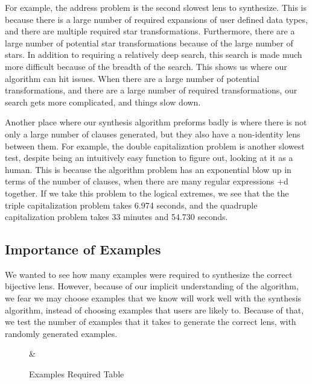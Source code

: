 For example, the address problem is the second slowest lens to synthesize.
This is because there is a large number of required expansions of user defined
data types, and there are multiple required star transformations.
Furthermore, there are a large number of potential star transformations because
of the large number of stars.
In addition to requiring a relatively deep search, this search is made much
more difficult because of the breadth of the search.
This shows us where our algorithm can hit issues.
When there are a large number of potential transformations, and there are a
large number of required transformations, our search gets more complicated,
and things slow down.

Another place where our synthesis algorithm preforms badly is where there is not
only a large number of clauses generated, but they also have a non-identity
lens between them.
For example, the double capitalization problem is another slowest test, despite
being an intuitively easy function to figure out, looking at it as a human.
This is because the algorithm problem has an exponential blow up in terms
of the number of clauses, when there are many regular expressions +d together.
If we take this problem to the logical extremes, we see that the the triple
capitalization problem takes 6.974 seconds, and the quadruple capitalization
problem takes 33 minutes and 54.730 seconds.

\subsection{Importance of Examples}
We wanted to see how many examples were required to synthesize the correct
bijective lens.
However, because of our implicit understanding of the algorithm, we fear we may
choose examples that we know will work well with the synthesis algorithm,
instead of choosing examples that users are likely to.
Because of that, we test the number of examples that it takes to generate the
correct lens, with randomly generated examples.

\begin{figure}
\centering

%
{\Test{} & \ExamplesRequired{}}%

\caption{Examples Required Table}
\label{fig:examples-required-table}
\end{figure}

